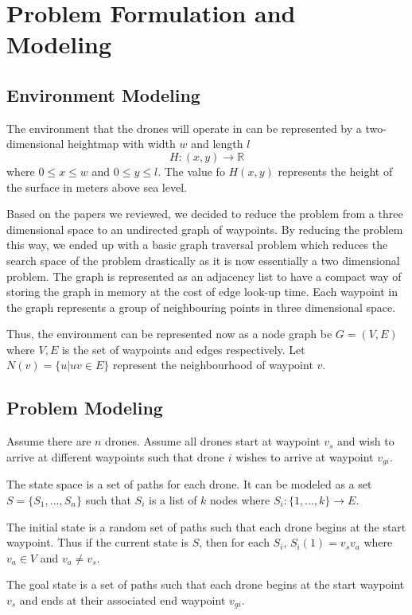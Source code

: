 \documentclass[conference]{IEEEtran}
\begin{document}
\section{Problem Formulation and Modeling}

\subsection{Environment Modeling}
The environment that the drones will operate in can be represented by a two-dimensional heightmap with width $w$ and length $l$
$$H : (x, y) \rightarrow \mathbb{R}$$
where $0 \leq x \leq w$ and $0 \leq y \leq l$. The value fo $H(x, y)$ represents the height of the surface in meters above sea level.

Based on the papers we reviewed, we decided to reduce the problem from a three dimensional space to an undirected graph of waypoints. By reducing the problem this way, we ended up with a basic graph traversal problem which reduces the search space of the problem drastically as it is now essentially a two dimensional problem. The graph is represented as an adjacency list to have a compact way of storing the graph in memory at the cost of edge look-up time. Each waypoint in the graph represents a group of neighbouring points in three dimensional space.

Thus, the environment can be represented now as a node graph be $G = (V, E)$ where $V, E$ is the set of waypoints and edges respectively. Let $N(v) = \{ u | uv \in E \}$ represent the neighbourhood of waypoint $v$.

\subsection{Problem Modeling}
Assume there are $n$ drones. Assume all drones start at waypoint $v_s$ and wish to arrive at different waypoints such that drone $i$ wishes to arrive at waypoint $v_{gi}$.

The state space is a set of paths for each drone. It can be modeled as a set $S = \{S_1, ..., S_n\}$ such that $S_i$ is a list of $k$ nodes where $S_i : \{1, ..., k\} \rightarrow E$.

The initial state is a random set of paths such that each drone begins at the start waypoint. Thus if the current state is $S$, then for each $S_i$, $S_i(1) = v_sv_a$ where $v_a \in V$ and $v_a\neq v_s$.

The goal state is a set of paths such that each drone begins at the start waypoint $v_s$ and ends at their associated end waypoint $v_{gi}$.
\end{document}
